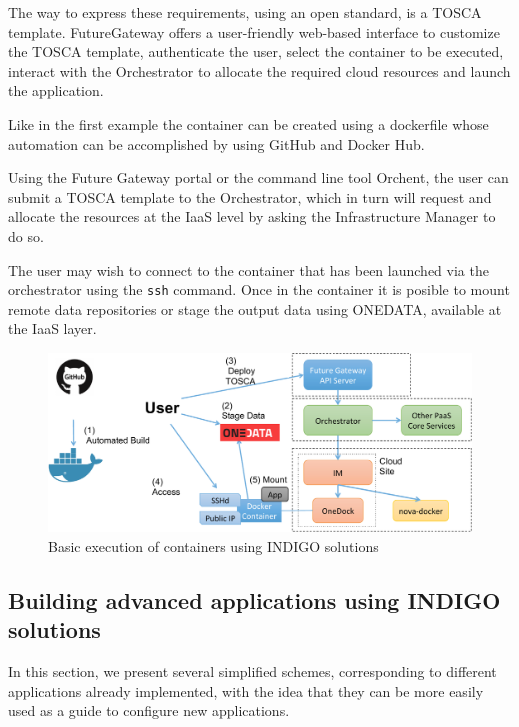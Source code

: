\documentclass{article}
\begin{document}
{\begin{itemize}
The way to express these requirements, using an open standard, is a TOSCA template. FutureGateway offers a user-friendly web-based interface to customize the TOSCA template, authenticate the user, select the container to be executed, interact with the Orchestrator to allocate the required cloud resources and launch the application. 

Like in the first example the container can be created using a dockerfile whose automation can be accomplished by using GitHub and Docker Hub.


Using the Future Gateway portal or the command line tool Orchent, the user can submit a TOSCA template to the Orchestrator, which in turn will request and allocate the resources at the IaaS level by asking the Infrastructure Manager to do so.

The user may wish to connect to the container that has been launched via the orchestrator using the {\tt ssh} command. Once in the container it is posible to mount remote data repositories or stage the output data using ONEDATA, available at the IaaS layer.

\end{itemize}


\begin{figure}
  \centering
  \includegraphics[width=\textwidth]{./figs/Figure12.pdf}
  \caption{Basic execution of containers using INDIGO solutions}
  \label{fig:12}
\end{figure}



\subsection{Building advanced applications using INDIGO solutions}


In this section, we present several simplified schemes, corresponding to different applications already implemented, with the idea that they can be more easily used as a guide to configure new applications.  

}
\end{document}
